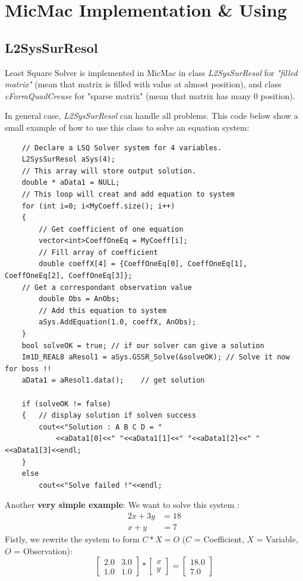 \documentclass[twoside]{article}
\begin{document}
\section{MicMac Implementation \& Using} 
\subsection{L2SysSurResol}
Least Square Solver is implemented in MicMac in class {\color{blue}\textit{L2SysSurResol}} for \textit{"filled matrix"} (mean that matrix is filled with value at almost position), and class {\color{blue}\textit{cFormQuadCreuse}} for "sparse matrix" (mean that matrix has many 0 position). 

In general case, {\color{blue}\textit{L2SysSurResol}} can handle all problems. This code below show a small example of how to use this class to solve an equation system:

\begin{lstlisting}
    // Declare a LSQ Solver system for 4 variables.
    L2SysSurResol aSys(4); 
    // This array will store output solution.
    double * aData1 = NULL;
    // This loop will creat and add equation to system
    for (int i=0; i<MyCoeff.size(); i++)
    {
    	// Get coefficient of one equation
    	vector<int>CoeffOneEq = MyCoeff[i];
    	// Fill array of coefficient
        double coeffX[4] = {CoeffOneEq[0], CoeffOneEq[1], CoeffOneEq[2], CoeffOneEq[3]};
	// Get a correspondant observation value       
        double Obs = AnObs;
        // Add this equation to system
        aSys.AddEquation(1.0, coeffX, AnObs);
    }
    bool solveOK = true; // if our solver can give a solution
    Im1D_REAL8 aResol1 = aSys.GSSR_Solve(&solveOK); // Solve it now for boss !!
    aData1 = aResol1.data();	// get solution

    if (solveOK != false)
    {	// display solution if solven success
        cout<<"Solution : A B C D = "
            <<aData1[0]<<" "<<aData1[1]<<" "<<aData1[2]<<" "<<aData1[3]<<endl;
    }
    else
        cout<<"Solve failed !"<<endl;
\end{lstlisting}

Another \textbf{very simple example}: We want to solve this system : 
\begin{equation}
\begin{aligned}
	2x+3y &= 18 \\
	x+y &= 7
\end{aligned}
\end{equation}
Fistly, we rewrite the system to form $C*X=O$ ($C$ = Coefficient, $X$ = Variable, $O$ = Observation):
\begin{equation}
	\begin{bmatrix}
		2.0 & 3.0 \\
		1.0 & 1.0
	\end{bmatrix}
	*
	\begin{bmatrix}
		x \\ y 
	\end{bmatrix}
	=
	\begin{bmatrix}
		18.0 \\ 7.0	
	\end{bmatrix}
\end{equation}
\end{document}
